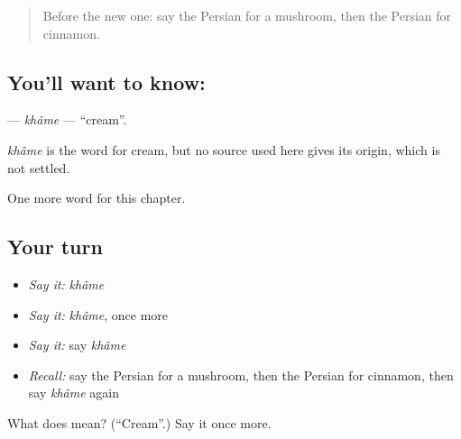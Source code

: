 \label{lesson:FA-C275-khame}



\begin{quote}
Before the new one: say the Persian for a mushroom, then the Persian for cinnamon.
\end{quote}

\subsection*{You'll want to know: }
\textbf{} — \emph{khâme} — \textquotedblleft{}cream\textquotedblright{}.

\begin{cousinweb}
\emph{khâme} is the word for cream, but no source used here gives its origin, which is not settled.
\end{cousinweb}

\begin{grammarlens}[title={What you've built}]
One more word for this chapter.
\end{grammarlens}

\subsection*{Your turn}
\begin{itemize}
\raggedright
  \item \emph{Say it:} \emph{khâme}
  \item \emph{Say it:} \emph{khâme}, once more
  \item \emph{Say it:} say \emph{khâme}
  \item \emph{Recall:} say the Persian for a mushroom, then the Persian for cinnamon, then say \emph{khâme} again
\end{itemize}

\begin{tcolorbox}[breakable,colback=teal!4,colframe=teal!35!black,title={Before you move on}]
What does  mean? (\textquotedblleft{}Cream\textquotedblright{}.) Say it once more.
\end{tcolorbox}
